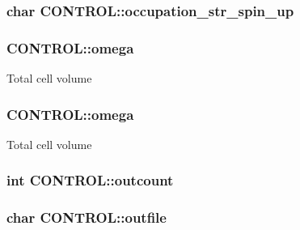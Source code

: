 \hypertarget{struct_c_o_n_t_r_o_l_a225ce9277ba4d8e6d0c57a32f6fdef90}{
\subsubsection[{occupation\-\_\-str\-\_\-spin\-\_\-up}]{\setlength{\rightskip}{0pt plus 5cm}char C\-O\-N\-T\-R\-O\-L\-::occupation\-\_\-str\-\_\-spin\-\_\-up}}\label{struct_c_o_n_t_r_o_l_a225ce9277ba4d8e6d0c57a32f6fdef90}
\hypertarget{struct_c_o_n_t_r_o_l_a7b78ae8099a8219095a292d2c1338990}{
\subsubsection[{omega}]{ C\-O\-N\-T\-R\-O\-L\-::omega}}\label{struct_c_o_n_t_r_o_l_a7b78ae8099a8219095a292d2c1338990}
Total cell volume \hypertarget{struct_c_o_n_t_r_o_l_a02804dea1bb7a28bf54b92a282725b7c}{
\subsubsection[{omega}]{ C\-O\-N\-T\-R\-O\-L\-::omega}}\label{struct_c_o_n_t_r_o_l_a02804dea1bb7a28bf54b92a282725b7c}
Total cell volume \hypertarget{struct_c_o_n_t_r_o_l_a2c7b7be53fee7f9d071cc1f99d30442e}{
\subsubsection[{outcount}]{\setlength{\rightskip}{0pt plus 5cm}int C\-O\-N\-T\-R\-O\-L\-::outcount}}\label{struct_c_o_n_t_r_o_l_a2c7b7be53fee7f9d071cc1f99d30442e}
\hypertarget{struct_c_o_n_t_r_o_l_ac5cf2f43d66f134f9ceeecc49e0f83c8}{
\subsubsection[{outfile}]{\setlength{\rightskip}{0pt plus 5cm}char C\-O\-N\-T\-R\-O\-L\-::outfile}}\label{struct_c_o_n_t_r_o_l_ac5cf2f43d66f134f9ceeecc49e0f83c8}
